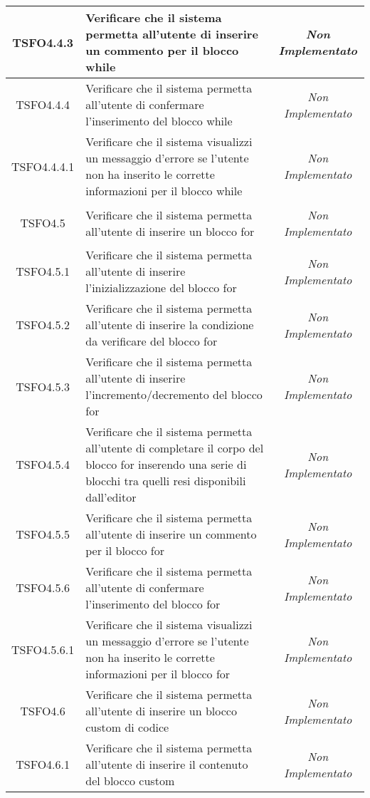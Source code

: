 \begin{longtable}{|c|>{}m{8cm}|c|}
\hypertarget{TSFO4.4.3}{TSFO4.4.3} & Verificare che il sistema permetta all'utente di inserire un commento per il blocco while & \textit{Non Implementato}\\ \hline
\hypertarget{TSFO4.4.4}{TSFO4.4.4} & Verificare che il sistema permetta all'utente di confermare l'inserimento del blocco while & \textit{Non Implementato}\\ \hline
\hypertarget{TSFO4.4.4.1}{TSFO4.4.4.1} & Verificare che il sistema visualizzi un messaggio d'errore se l'utente non ha inserito le corrette informazioni per il blocco while & \textit{Non Implementato}\\ \hline
\hypertarget{TSFO4.5}{TSFO4.5} & Verificare che il sistema permetta all'utente di inserire un blocco for & \textit{Non Implementato}\\ \hline
\hypertarget{TSFO4.5.1}{TSFO4.5.1} & Verificare che il sistema permetta all'utente di inserire l'inizializzazione del blocco for & \textit{Non Implementato}\\ \hline
\hypertarget{TSFO4.5.2}{TSFO4.5.2} & Verificare che il sistema permetta all'utente di inserire la condizione da verificare del blocco for & \textit{Non Implementato}\\ \hline
\hypertarget{TSFO4.5.3}{TSFO4.5.3} & Verificare che il sistema permetta all'utente di inserire l'incremento/decremento del blocco for & \textit{Non Implementato}\\ \hline
\hypertarget{TSFO4.5.4}{TSFO4.5.4} & Verificare che il sistema permetta all'utente di completare il corpo del blocco for inserendo una serie di blocchi tra quelli resi disponibili dall'editor & \textit{Non Implementato}\\ \hline
\hypertarget{TSFO4.5.5}{TSFO4.5.5} & Verificare che il sistema permetta all'utente di inserire un commento per il blocco for & \textit{Non Implementato}\\ \hline
\hypertarget{TSFO4.5.6}{TSFO4.5.6} & Verificare che il sistema permetta all'utente di confermare l'inserimento del blocco for & \textit{Non Implementato}\\ \hline
\hypertarget{TSFO4.5.6.1}{TSFO4.5.6.1} & Verificare che il sistema visualizzi un messaggio d'errore se l'utente non ha inserito le corrette informazioni per il blocco for & \textit{Non Implementato}\\ \hline
\hypertarget{TSFO4.6}{TSFO4.6} & Verificare che il sistema permetta all'utente di inserire un blocco custom di codice & \textit{Non Implementato}\\ \hline
\hypertarget{TSFO4.6.1}{TSFO4.6.1} & Verificare che il sistema permetta all'utente di inserire il contenuto del blocco custom & \textit{Non Implementato}\\ \hline

\end{longtable}
